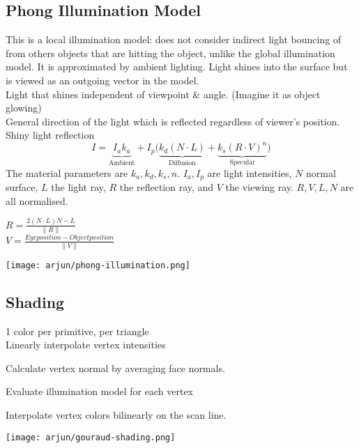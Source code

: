 \subsection*{Phong Illumination Model}
This is a local illumination model: does not consider indirect light bouncing of from others objects that are hitting the object, unlike the global illumination model. It is approximated by ambient lighting.
Light shines into the surface but is viewed as an outgoing vector in the model.\\
 Light that shines independent of viewpoint \& angle. (Imagine it as object glowing) \\
 General direction of the light which is reflected regardless of viewer's position.\\
 Shiny light reflection
$$I = \underbrace{I_ak_a }_\text{Ambient} + I_p \bigl( \underbrace{k_d(N \cdot L)}_\text{Diffusion} + \underbrace{k_s(R \cdot V)^n}_\text{Specular} \bigr)$$
The material parameters are $k_a, k_d, k_s, n$. $I_a, I_p$ are light intensities, $N$ normal surface, $L$ the light ray, $R$ the reflection ray, and $V$ the viewing ray. $R, V, L, N$ are all normalised. 

\begin{minipage}{0.6\columnwidth}
    $R = \frac{2(N \cdot L)N - L}{\lVert R \rVert} $ \\
$V = \frac{Eye position - Object position}{\lVert V \rVert} $
\end{minipage}
\begin{minipage}{0.4\columnwidth}
    \texttt{[image: arjun/phong-illumination.png]}
\end{minipage}

\subsection*{Shading}
 1 color per primitive, per triangle \\
 Linearly interpolate vertex intensities
\begin{compactenum}
    \item Calculate vertex normal by averaging face normals.
    \item Evaluate illumination model for each vertex
    \item Interpolate vertex colors bilinearly on the scan line.
\end{compactenum}
\begin{center}
    \texttt{[image: arjun/gouraud-shading.png]}
\end{center}

